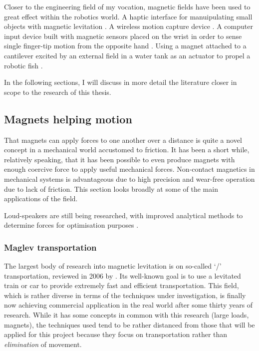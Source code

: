 Closer to the engineering field of my vocation, magnetic fields have been used to great effect within the robotics world. A haptic interface for manuipulating small objects with magnetic levitation \cite{vanwest2007}.
A wireless motion capture device \cite{hashi2005}.
A computer input device built with magnetic sensors placed on the wrist in order to sense single finger-tip motion from the opposite hand \parencite{han2008}.
Using a magnet attached to a cantilever excited by an external field in a water tank as an actuator to propel a robotic fish \cite{tomie2005}.

In the following sections, I will discuss in more detail the literature closer in scope to the research of this thesis.


\subsection{Magnets helping motion}

That magnets can apply forces to one another over a distance is quite a novel concept in a mechanical world accustomed to friction.
It has been a short while, relatively speaking, that it has been possible to even produce magnets with enough coercive force to apply useful mechanical forces.
Non-contact magnetics in mechanical systems is advantageous due to high precision and wear-free operation due to lack of friction.
This section looks broadly at some of the main applications of the field.

Loud-speakers are still being researched, with improved analytical methods to determine forces for optimisation purposes \cite{merit2009}.


\subsubsection{Maglev transportation}

The largest body of research into magnetic levitation is on so-called `\maglev/'
transportation, reviewed in 2006 by \textcite{lee2006}.
Its well-known goal is to use a levitated train or car to provide extremely fast and efficient transportation.
This field, which is rather diverse in terms of the techniques under investigation, is finally now achieving commercial application in the real world after some thirty years of research.
While it has some concepts in common with this research (large loads, magnets), the techniques used tend to be rather distanced from those that will be applied for this project because they focus on transportation rather than \emph{elimination} of movement.


